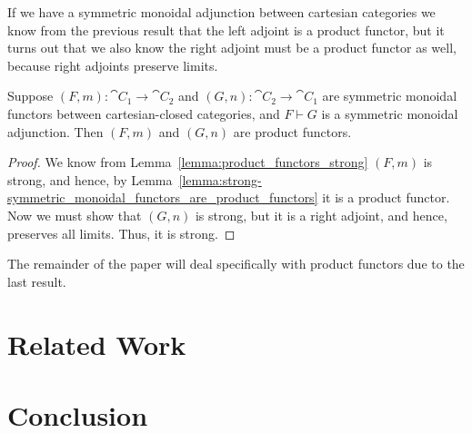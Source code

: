 If we have a symmetric monoidal adjunction between cartesian
categories we know from the previous result that the left adjoint is a
product functor, but it turns out that we also know the right adjoint
must be a product functor as well, because right adjoints preserve
limits.

\begin{lemma}
  \label{lemma:adjoint-CCC-prod-func}
  Suppose $(F,m) : \cat{C}_1 \to \cat{C}_2$ and $(G,n) : \cat{C}_2 \to
  \cat{C}_1$ are symmetric monoidal functors between cartesian-closed
  categories, and $F \vdash G$ is a symmetric monoidal adjunction.
  Then $(F,m)$ and $(G,n)$ are product functors.
\end{lemma}
\begin{proof}
  We know from Lemma~\ref{lemma:product_functors_strong} $(F,m)$ is
  strong, and hence, by
  Lemma~\ref{lemma:strong-symmetric_monoidal_functors_are_product_functors}
  it is a product functor.  Now we must show that $(G,n)$ is strong,
  but it is a right adjoint, and hence, preserves all limits.  Thus,
  it is strong.
\end{proof}
\noindent
The remainder of the paper will deal specifically with product
functors due to the last result.


\section{Related Work}
\label{sec:related_work}

\section{Conclusion}
\label{sec:conclusion}




\nocite{*}
\appendix




